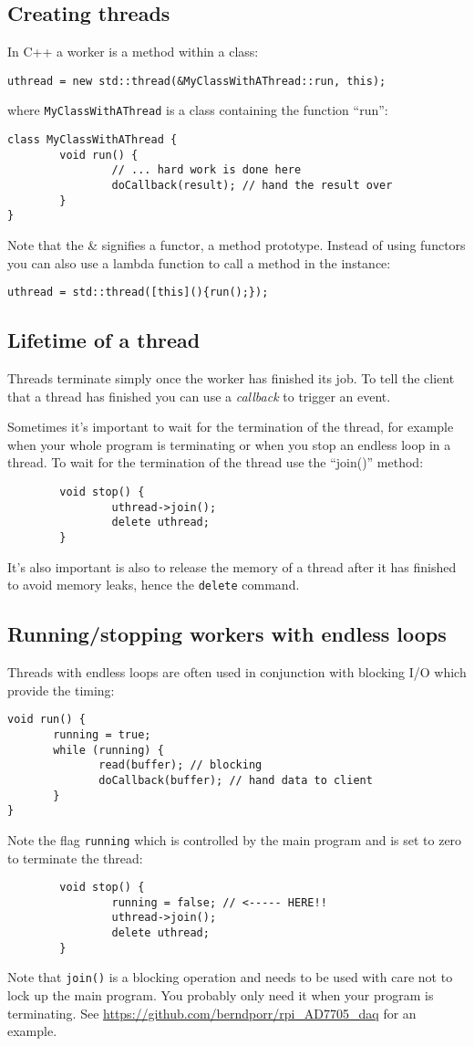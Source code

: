 \documentclass[12pt]{report}
\begin{document}
\subsection{Creating threads}
In C++ a worker is a method within
a class:
\begin{verbatim}
uthread = new std::thread(&MyClassWithAThread::run, this);
\end{verbatim}
where \texttt{MyClassWithAThread} is a class containing the function ``run'':
\begin{verbatim}
class MyClassWithAThread {
        void run() {
                // ... hard work is done here
                doCallback(result); // hand the result over
        }
}
\end{verbatim}
Note that the \& signifies a functor, a method prototype.
Instead of using functors you can also use a lambda function
to call a method in the instance:
\begin{verbatim}
uthread = std::thread([this](){run();});
\end{verbatim}


\subsection{Lifetime of a thread}
Threads terminate simply once the worker has finished its job.
To tell the client that a thread has finished you can use a
\textsl{callback} to trigger an event.

Sometimes it's important to wait for the termination of the thread,
for example when your whole program is terminating or when
you stop an endless loop in a thread. To wait for the termination
of the thread use the ``join()'' method:
\begin{verbatim}
        void stop() {
                uthread->join();
                delete uthread;
        }
\end{verbatim}
It's also important is also to release the memory of a thread after it has finished
to avoid memory leaks, hence the \texttt{delete} command.


\subsection{Running/stopping workers with endless loops}
Threads with endless loops are often used in conjunction with blocking
I/O which provide the timing:
\begin{verbatim}
void run() {
       running = true;
       while (running) {
              read(buffer); // blocking
              doCallback(buffer); // hand data to client
       }
}
\end{verbatim}
Note the flag \texttt{running} which is controlled by the main program and is set to zero to terminate
the thread:
\begin{verbatim}
        void stop() {
                running = false; // <----- HERE!!
                uthread->join();
                delete uthread;
        }
\end{verbatim}
Note that \texttt{join()} is a blocking operation and needs to be used with care not to
lock up the main program. You probably only need it when your program is terminating.
See \url{https://github.com/berndporr/rpi_AD7705_daq} for an example.
\end{document}
